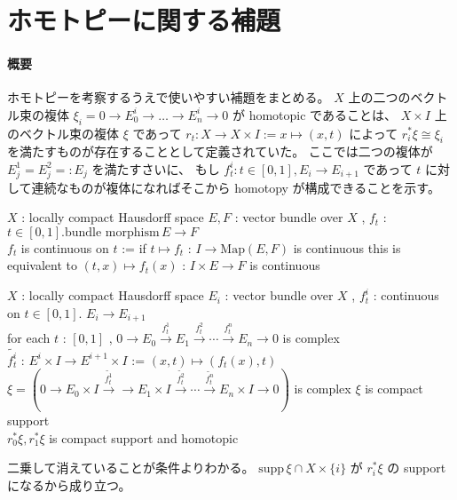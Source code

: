 \documentclass[dvipdfmx]{jsarticle}
\begin{document}
\section*{ホモトピーに関する補題}
\paragraph*{概要}
ホモトピーを考察するうえで使いやすい補題をまとめる。
\(X\) 上の二つのベクトル束の複体 \(\xi_i = 0 \to E^i_0 \to \ldots \to E^i_n \to 0\) が homotopic であることは、 \(X \times I\) 上のベクトル束の複体 \(\xi\) であって \(r_t : X \to X \times I := x \mapsto (x , t)\) によって \(r_i^* \xi \cong \xi_i\) を満たすものが存在することとして定義されていた。
ここでは二つの複体が \(E^1_j = E^2_j =: E_j\) を満たすさいに、 もし \(f_t^i : t \in [0,1] , E_i \to E_{i+1}\) であって \(t\) に対して連続なものが複体になればそこから homotopy が構成できることを示す。

\begin{Definition}
  \itemwhen
  \Fix \(X\) : locally compact Hausdorff space
  \itemdefi
  \For \(E , F\) : vector bundle over \(X\) , \(f_t\) : \(t \in [0,1] . \text{bundle morphism} \, E \to F\) \\
  \Define \(f_t\) is continuous on \(t\) := if \(t \mapsto f_t\) : \(I \to \text{Map}(E,F)\) is continuous
\itemprop
\Then this is equivalent to \((t , x) \mapsto f_t(x)\) : \(I \times E \to F\) is continuous
\end{Definition}

\begin{Theorem}
  \itemwhen
  \Fix \(X\) : locally compact Hausdorff space
  \itemprop
  \For \(E_i\) : vector bundle over \(X\) , \(f^i_t\) : continuous on \(t \in [0,1]\). \(E_i \to E_{i+1}\) \\
  \IfHold for each \(t\) : \([0,1]\) , \(0 \to E_0 \overset{f^1_t}{\to} E_1 \overset{f^2_t}{\to} \cdots \overset{f^n_t}{\to} E_n \to 0\) is complex \\
  \Let \(\tilde{f^i_t}\) : \(E^i \times I \to E^{i+1} \times I\) := \((x,t) \mapsto (f_t(x) , t)\) \\
  \Then \(\xi = (0 \to E_0 \times I \overset{\tilde{f^1_t}}{\to} \to E_1 \times I \overset{\tilde{f^2_t}}{\to} \cdots \overset{\tilde{f^n_t}}{\to} E_n \times I \to 0)\) is complex
  \itemprop
  \IfHold \(\xi\) is compact support \\
  \Then \(r_0^* \xi , r_1^* \xi\) is compact support and homotopic
\end{Theorem}

\begin{Proof}
  \itemprof
  二乗して消えていることが条件よりわかる。
  \itemprof
  \(\text{supp} \, \xi \cap X \times \{i\}\) が \(r_i^* \xi\) の support になるから成り立つ。
\end{Proof}
\end{document}
